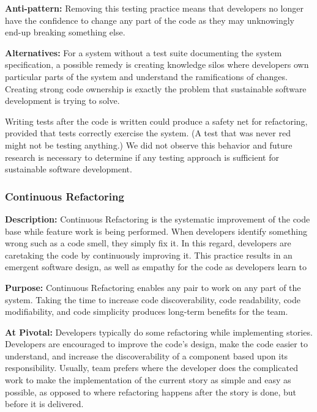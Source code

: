 \textbf{Anti-pattern:} Removing this testing practice means that developers no longer have the confidence to change any part of the code as they may unknowingly end-up breaking something else. 

\textbf{Alternatives:} For a system without a test suite documenting the system specification, a possible remedy is creating knowledge silos where developers own particular parts of the system and understand the ramifications of changes. Creating strong code ownership is exactly the problem that sustainable software development is trying to solve.

Writing tests after the code is written could produce a safety net for refactoring, provided that tests correctly exercise the system. (A test that was never red might not be testing anything.) We did not observe this behavior and future research is necessary to determine if any testing approach is sufficient for sustainable software development.

\subsubsection{Continuous Refactoring}
\textbf{Description:} Continuous Refactoring is the systematic improvement of the code base while feature work is being performed. When developers identify something wrong such as a code smell, they simply fix it. In this regard, developers are caretaking the code by continuously improving it. This practice results in an emergent software design, as well as empathy for the code as developers learn to  


\textbf{Purpose:} Continuous Refactoring enables any pair to work on any part of the system. Taking the time to increase code discoverability, code readability, code modifiability, and code simplicity produces long-term benefits for the team. 

\textbf{At Pivotal:} Developers typically do some refactoring while implementing stories. Developers are encouraged to improve the code's design, make the code easier to understand, and increase the discoverability of a component based upon its responsibility. Usually, team prefers  where the developer does the complicated work to make the implementation of the current story as simple and easy as possible, as opposed to  where refactoring happens after the story is done, but before it is delivered.  

